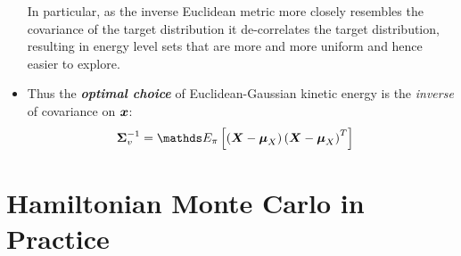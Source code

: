 \documentclass[11pt]{article}
\begin{document}
\begin{itemize}
In particular, as the inverse Euclidean metric more closely resembles the covariance of the target distribution it de-correlates the target distribution, resulting in energy level sets that are more and more uniform and hence easier to explore. 

\item Thus the \emph{\textbf{optimal choice}} of Euclidean-Gaussian kinetic energy is the \emph{inverse} of covariance on $\boldsymbol{x}$:
\begin{align*}
\mb{\Sigma}_{v}^{-1} &= \E{\pi}{\paren{\mb{X}-\mb{\mu}_{X}}\paren{\mb{X}-\mb{\mu}_{X}}^{T}}
\end{align*}


\end{itemize}


\section{Hamiltonian Monte Carlo in Practice}
\end{document}
